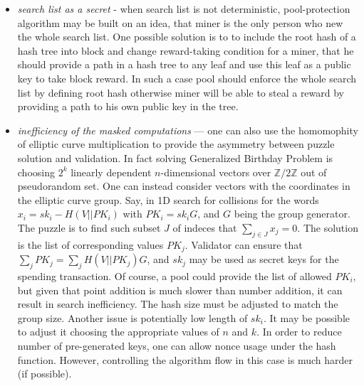\begin{itemize}
    \item{\em search list as a secret} - when search list is not deterministic,
    pool-protection algorithm may be built on
    an idea, that miner is the only person who new the whole search list.
    One possible solution is to to include the root hash
    of a hash tree into block and change reward-taking condition for a miner, that he should provide a path in
    a hash tree to any leaf and use this leaf as a public key to take block reward.
    In such a case pool should enforce the whole search list by defining root hash otherwise miner will be able to
    steal a reward by providing a path to his own public key in the tree.
    
\item{\em inefficiency of the masked computations} --- one can also use the
    homomophity of elliptic curve multiplication to provide the asymmetry
    between puzzle solution and validation. In fact solving Generalized Birthday
    Problem is choosing $2^k$ linearly dependent $n$-dimensional vectors over
    $\mathbb{Z}/2\mathbb{Z}$ out of pseudorandom set. One can instead consider
    vectors with the coordinates in the elliptic curve group. Say, in 1D search for
    collisions for the words $x_i = sk_i - H(V||PK_i)$ with $PK_i=sk_iG$, and $G$
    being the group generator. The puzzle is to find such subset $J$ of indeces
    that $\sum_{j\in J} x_j = 0$. The solution is the list of corresponding
    values $PK_j$. Validator can ensure that $\sum_j PK_j =
    \sum_jH(V||PK_j)G$, and $sk_j$ may be used as secret keys for the
    spending transaction. Of course, a pool could provide the list of allowed $PK_i$,
    but given that point addition is much slower than number addition, it can
    result in search inefficiency. The hash size must be adjusted to match the
    group size. Another issue is potentially low length of $sk_i$. It
    may be possible to adjust it choosing the appropriate values of $n$ and
    $k$. In order to reduce number of pre-generated keys, one can allow nonce
    usage under the hash function. However, controlling the algorithm flow in this
    case is much harder (if possible).

\end{itemize}
